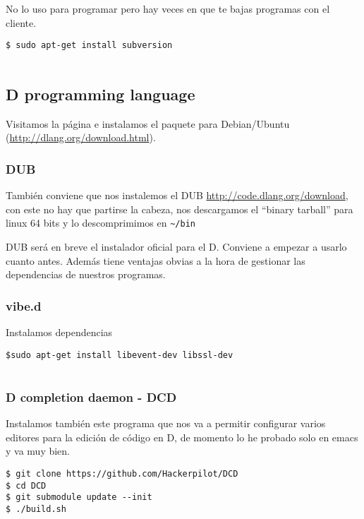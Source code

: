 No lo uso para programar pero hay veces en que te bajas programas con el
cliente.

\begin{verbatim}
$ sudo apt-get install subversion
      
\end{verbatim}

\subsection{D programming language}\label{d-programming-language}

Visitamos la página e instalamos el paquete para Debian/Ubuntu
(\url{http://dlang.org/download.html}).

\subsubsection{DUB}\label{dub}

También conviene que nos instalemos el DUB
\url{http://code.dlang.org/download}, con este no hay que partirse la
cabeza, nos descargamos el ``binary tarball'' para linux 64 bits y lo
descomprimimos en \texttt{\textasciitilde{}/bin}

DUB será en breve el instalador oficial para el D. Conviene a empezar a
usarlo cuanto antes. Además tiene ventajas obvias a la hora de gestionar
las dependencias de nuestros programas.

\subsubsection{vibe.d}\label{vibe.d}

Instalamos dependencias

\begin{verbatim}
$sudo apt-get install libevent-dev libssl-dev
        
\end{verbatim}

\subsubsection{D completion daemon -
DCD}\label{d-completion-daemon---dcd}

Instalamos también este programa que nos va a permitir configurar varios
editores para la edición de código en D, de momento lo he probado solo
en emacs y va muy bien.

\begin{verbatim}
$ git clone https://github.com/Hackerpilot/DCD
$ cd DCD
$ git submodule update --init
$ ./build.sh
        
\end{verbatim}

